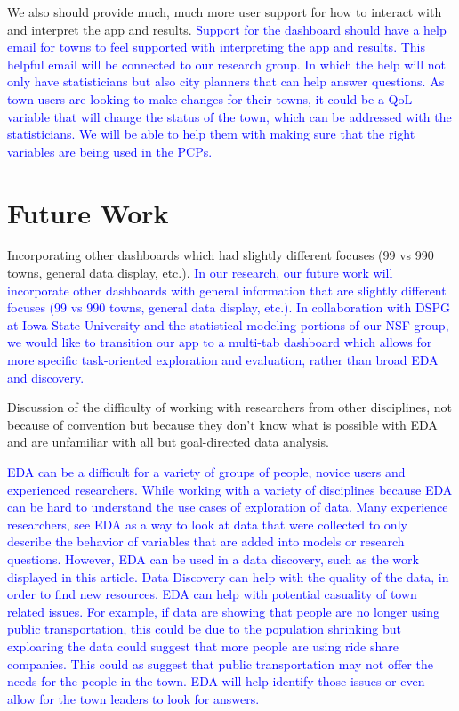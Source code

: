 \documentclass[letterpaper,inpress]{jdsart}
\begin{document}
We also should provide much, much more user support for how to interact with and interpret the app and results.
{\textcolor{blue}{Support for the dashboard should have a help email for towns to feel supported with interpreting the app and results. This helpful email will be connected to our research group. In which the help will not only have statisticians but also city planners that can help answer questions. As town users are looking to make changes for their towns, it could be a QoL variable that will change the status of the town, which can be addressed with the statisticians. We will be able to help them with making sure that the right variables are being used in the PCPs. }}

\section{ Future Work }

Incorporating other dashboards which had slightly different focuses (99 vs 990 towns, general data display, etc.).
{\textcolor{blue}{In our research, our future work will incorporate other dashboards with general information that are slightly different focuses (99 vs 990 towns, general data display, etc.). In collaboration with DSPG at Iowa State University and the statistical modeling portions of our NSF group, we would like to transition our app to a multi-tab dashboard which allows for more specific task-oriented exploration and evaluation, rather than broad EDA and discovery.}}

Discussion of the difficulty of working with researchers from other disciplines, not because of convention but because they don't know what is possible with EDA and are unfamiliar with all but goal-directed data analysis.

{\textcolor{blue}{EDA can be a difficult for a variety of groups of people, novice users and experienced researchers. While working with a variety of  disciplines because EDA can be hard to understand the use cases of exploration of data. Many experience researchers, see EDA as a way to look at data that were collected to only describe the behavior of variables that are added into models or research questions. However, EDA can be used in a data discovery, such as the work displayed in this article. Data Discovery can help with the quality of the data, in order to find new resources. EDA can help with potential casuality of town related issues. For example, if data are showing that people are no longer using public transportation, this could be due to the population shrinking but exploaring the data could suggest that more people are using ride share companies. This could as suggest that public transportation may not offer the needs for the people in the town. EDA will help identify those issues or even allow for the town leaders to look for answers.}}
\end{document}
